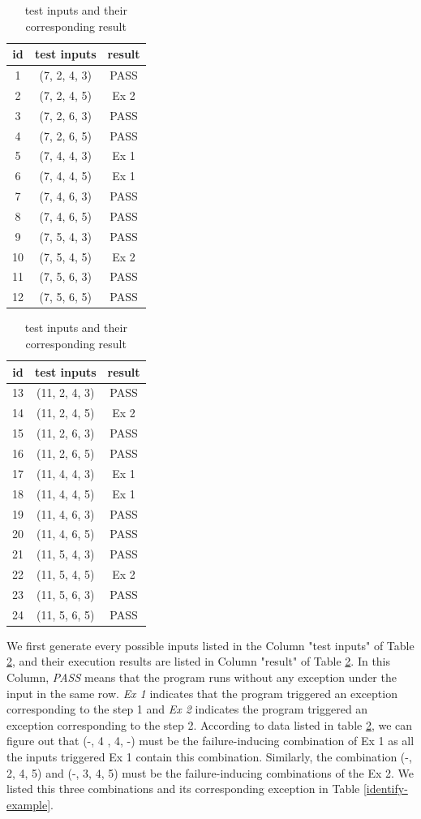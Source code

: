 \documentclass{sig-alternate}
\begin{document}
\begin{table}
  \caption{test inputs and their corresponding result}\label{test-example}
  \centering
  \begin{tabular}{ccc}
id&test inputs & result\\\hline
1&(7, 2, 4, 3) &  PASS\\ \hline
2&(7, 2, 4, 5) &  Ex 2\\ \hline
3&(7, 2, 6, 3) &  PASS\\ \hline
4&(7, 2, 6, 5) &  PASS\\ \hline
5&(7, 4, 4, 3) &  Ex 1\\ \hline
6&(7, 4, 4, 5) &  Ex 1\\ \hline
7&(7, 4, 6, 3) &  PASS\\ \hline
8&(7, 4, 6, 5) &  PASS\\ \hline
9&(7, 5, 4, 3) &  PASS\\ \hline
10&(7, 5, 4, 5) &  Ex 2\\ \hline
11&(7, 5, 6, 3) &  PASS\\ \hline
12&(7, 5, 6, 5) &  PASS\\ \hline
  \end{tabular}
  \hspace{1em}
  \begin{tabular}{ccc}
id&test inputs & result\\\hline
13&(11, 2, 4, 3)& PASS\\ \hline
14&(11, 2, 4, 5)& Ex 2\\ \hline
15&(11, 2, 6, 3)& PASS\\ \hline
16&(11, 2, 6, 5)& PASS\\ \hline
17&(11, 4, 4, 3)& Ex 1\\ \hline
18&(11, 4, 4, 5)& Ex 1\\ \hline
19&(11, 4, 6, 3)& PASS\\ \hline
20&(11, 4, 6, 5)& PASS\\ \hline
21&(11, 5, 4, 3)& PASS\\ \hline
22&(11, 5, 4, 5)& Ex 2\\ \hline
23&(11, 5, 6, 3)& PASS\\ \hline
24&(11, 5, 6, 5)& PASS\\ \hline
  \end{tabular}
  \end{table}

We first generate every possible inputs listed in the Column "test inputs" of Table \ref{test-example}, and their execution results are listed in Column "result" of Table \ref{test-example}. In this Column, \emph{PASS} means that the program runs without any exception under the input in the same row. \emph{Ex 1} indicates that the program triggered an exception corresponding to the step 1 and \emph{Ex 2} indicates the program triggered an exception corresponding to the step 2. According to data listed in table \ref{test-example}, we can figure out that (-, 4 , 4, -) must be the failure-inducing combination of Ex 1 as all the inputs triggered Ex 1 contain this combination. Similarly, the combination (-, 2, 4, 5) and  (-, 3, 4, 5) must be the failure-inducing combinations of the Ex 2. We listed this three combinations and its corresponding exception in Table \ref{identify-example}.
\end{document}
